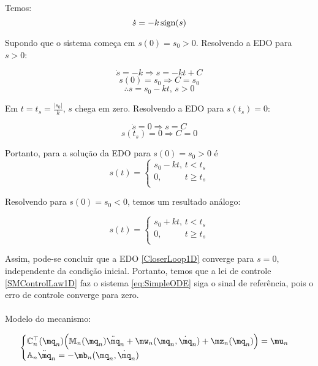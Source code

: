 Temos:
\begin{equation} \label{CloserLoop1D}
\dot{s} = -k \operatorname*{sign}(s) 
\end{equation}

Supondo que o sistema come\c{c}a em $s(0) = s_0 >0$. Resolvendo a EDO para $s>0$:

$$ \dot{s} = -k \Rightarrow s = -k t + C $$
$$ s(0) = s_0 \Rightarrow C = s_0 $$
$$ \therefore s = s_0 - k t, \, s>0 $$

Em $t = t_s = \frac{|s_0|}{k}$, $s$ chega em zero. Resolvendo a EDO para $s(t_s) = 0$:

$$ \dot{s} = 0 \Rightarrow s =  C $$
$$ s(t_s) = 0 \Rightarrow C = 0 $$

Portanto, para a solu\c{c}\~ao da EDO para $s(0) = s_0 > 0$ é
\begin{equation} \label{eq:SM-ODE-Sol1}
s(t) =
\begin{cases}
s_0 - k t, \, t < t_s \\
0, \,\,\,\,\,\,\,\,\,\,\,\,\,\,\,\, t \geq t_s \\
\end{cases}
\end{equation}

Resolvendo para $s(0) = s_0 < 0$, temos um resultado an\'alogo:

\begin{equation} \label{eq:SM-ODE-Sol2}
s(t) =
\begin{cases}
s_0 + k t, \, t < t_s \\
0, \,\,\,\,\,\,\,\,\,\,\,\,\,\,\,\, t \geq t_s \\
\end{cases}
\end{equation}

Assim, pode-se concluir que a EDO \eqref{CloserLoop1D} converge para $s=0$, independente da condi\c{c}\~ao inicial. Portanto, temos que a lei de controle \eqref{SMControlLaw1D} faz o sistema \eqref{eq:SimpleODE} siga o sinal de referência, pois o erro de controle converge para zero. \\

\\
 
Modelo do mecanismo:

$$
\begin{cases}
\mC_n^\top (\mq_n) \Big( \mM_n (\mq_n) \ddot{\mq}_n + \mw_n (\mq_n, \dot{\mq}_n) + \mz_n (\mq_n) \Big) = \mu_n \\
\mA_n \ddot{\mq}_n = - \mb_n (\mq_n, \dot{\mq}_n)
\end{cases}
$$

